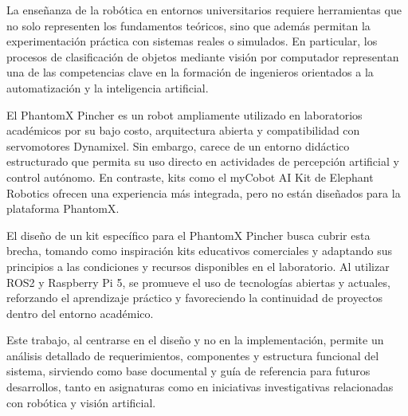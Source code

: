 La enseñanza de la robótica en entornos universitarios requiere herramientas que no solo representen los fundamentos teóricos, sino que además permitan la experimentación práctica con sistemas reales o simulados. En particular, los procesos de clasificación de objetos mediante visión por computador representan una de las competencias clave en la formación de ingenieros orientados a la automatización y la inteligencia artificial.

El PhantomX Pincher es un robot ampliamente utilizado en laboratorios académicos por su bajo costo, arquitectura abierta y compatibilidad con servomotores Dynamixel. Sin embargo, carece de un entorno didáctico estructurado que permita su uso directo en actividades de percepción artificial y control autónomo. En contraste, kits como el myCobot AI Kit de Elephant Robotics ofrecen una experiencia más integrada, pero no están diseñados para la plataforma PhantomX.

El diseño de un kit específico para el PhantomX Pincher busca cubrir esta brecha, tomando como inspiración kits educativos comerciales y adaptando sus principios a las condiciones y recursos disponibles en el laboratorio. Al utilizar ROS2 y Raspberry Pi 5, se promueve el uso de tecnologías abiertas y actuales, reforzando el aprendizaje práctico y favoreciendo la continuidad de proyectos dentro del entorno académico.

Este trabajo, al centrarse en el diseño y no en la implementación, permite un análisis detallado de requerimientos, componentes y estructura funcional del sistema, sirviendo como base documental y guía de referencia para futuros desarrollos, tanto en asignaturas como en iniciativas investigativas relacionadas con robótica y visión artificial.